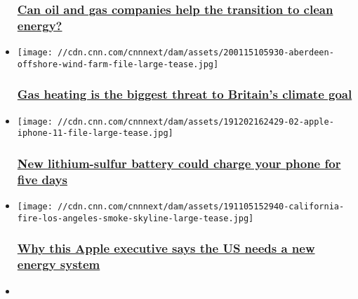 \begin{itemize}
{  \subsubsection{\texorpdfstring{\href{/2020/01/23/energy/davos-global-energy-challenge-panel/index.html}{Can
  oil and gas companies help the transition to clean
  energy?}}{Can oil and gas companies help the transition to clean energy?}}\label{can-oil-and-gas-companies-help-the-transition-to-clean-energy}}
\item
  \href{/2020/01/18/business/uk-net-zero-emissions-2050/index.html}{}

  \texttt{[image: //cdn.cnn.com/cnnnext/dam/assets/200115105930-aberdeen-offshore-wind-farm-file-large-tease.jpg]}

  \hypertarget{gas-heating-is-the-biggest-threat-to-britains-climate-goal}{%
  \subsubsection{\texorpdfstring{\href{/2020/01/18/business/uk-net-zero-emissions-2050/index.html}{Gas
  heating is the biggest threat to Britain's climate
  goal}}{Gas heating is the biggest threat to Britain's climate goal}}\label{gas-heating-is-the-biggest-threat-to-britains-climate-goal}}
\item
  \href{/2020/01/06/tech/lithium-sulfur-battery-scli-intl-scn/index.html}{}

  \texttt{[image: //cdn.cnn.com/cnnnext/dam/assets/191202162429-02-apple-iphone-11-file-large-tease.jpg]}

  \hypertarget{new-lithium-sulfur-battery-could-charge-your-phone-for-five-days}{%
  \subsubsection{\texorpdfstring{\href{/2020/01/06/tech/lithium-sulfur-battery-scli-intl-scn/index.html}{New
  lithium-sulfur battery could charge your phone for five
  days}}{New lithium-sulfur battery could charge your phone for five days}}\label{new-lithium-sulfur-battery-could-charge-your-phone-for-five-days}}
\item
  \href{/2019/11/07/tech/apple-environment-lisa-jackson-interview/index.html}{}

  \texttt{[image: //cdn.cnn.com/cnnnext/dam/assets/191105152940-california-fire-los-angeles-smoke-skyline-large-tease.jpg]}

  \hypertarget{why-this-apple-executive-says-the-us-needs-a-new-energy-system}{%
  \subsubsection{\texorpdfstring{\href{/2019/11/07/tech/apple-environment-lisa-jackson-interview/index.html}{Why
  this Apple executive says the US needs a new energy
  system}}{Why this Apple executive says the US needs a new energy system}}\label{why-this-apple-executive-says-the-us-needs-a-new-energy-system}}
\item
  \href{/2019/11/07/business/america-number-one-oil-producer-now/index.html}{}


\end{itemize}
